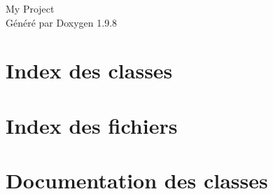 \documentclass[twoside]{book}
\newcommand{\+}{\discretionary{\mbox{\scriptsize$\hookleftarrow$}}{}{}}
\newcommand{\clearemptydoublepage}{%
    \newpage{\pagestyle{empty}\cleardoublepage}%
  }
\begin{document}
  \raggedbottom
    \hypersetup{pageanchor=false,
                bookmarksnumbered=true,
                pdfencoding=unicode
               }
  \begin{titlepage}
  \vspace*{7cm}
  \begin{center}%
  {\Large My Project}\\
  \vspace*{1cm}
  {\large Généré par Doxygen 1.9.8}\\
  \end{center}
  \end{titlepage}
  \clearemptydoublepage
  \tableofcontents
  \clearemptydoublepage
  \hypersetup{pageanchor=true}

\chapter{Index des classes}

\chapter{Index des fichiers}

\chapter{Documentation des classes}















































\end{document}
